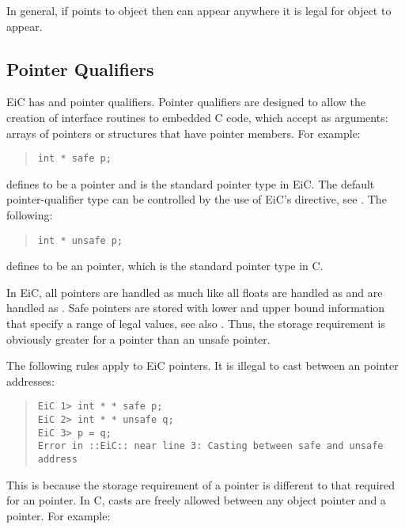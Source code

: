 In general, if  points to object  then  can appear
anywhere it is legal for object  to appear.

\subsection{Pointer Qualifiers}
\label{sec:pointerQualifer}

EiC has  and  pointer qualifiers. Pointer qualifiers
are designed to allow the creation of interface routines to embedded C
code, which accept as arguments: arrays of pointers or structures that
have pointer members. For example:

\begin{quote}
\begin{verbatim}
int * safe p;
\end{verbatim}
\end{quote}
 defines  to be a  pointer and is the standard
pointer type in EiC. The default pointer-qualifier type can be
controlled by the use of EiC's  
directive, see  . The following:

\begin{quote}
\begin{verbatim}
int * unsafe p;
\end{verbatim}
\end{quote}
 defines  to be an  pointer, which is the standard
pointer type in C. 


In EiC, all pointers are handled as  much like all floats are
handled as  and  are handled as . Safe
pointers are stored with lower and upper bound information that
specify a range of legal values, see also
.  Thus, the storage requirement is
obviously greater for a  pointer than an unsafe pointer.

The following rules apply to EiC pointers. It is illegal to cast
between  an  pointer addresses:

\begin{quote}
\begin{verbatim}
EiC 1> int * * safe p;
EiC 2> int * * unsafe q;
EiC 3> p = q;
Error in ::EiC:: near line 3: Casting between safe and unsafe address
\end{verbatim}
\end{quote}

This is because the storage requirement of a  pointer is
different to that required for an  pointer. In C, casts are
freely allowed between any object pointer and a
 pointer. For example:

